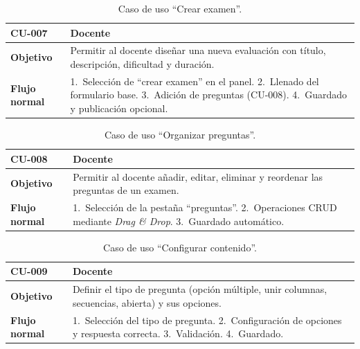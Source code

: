 \begin{table}[H]
\centering
\caption{Caso de uso ``Crear examen''.}
\label{tab:cu_crear_examen}
\begin{small}
\begin{tabularx}{\textwidth}{|L{3cm}|X|}
\hline
{}
 CU-007 &  Docente\\
\hline
\textbf{Objetivo} & Permitir al docente diseñar una nueva evaluación con título, descripción, dificultad y duración.\\
\hline
\textbf{Flujo normal} & 1.~Selección de ``crear examen'' en el panel. 2.~Llenado del formulario base. 3.~Adición de preguntas (CU-008). 4.~Guardado y publicación opcional.\\
\hline
\end{tabularx}
\end{small}
\fuenteautor
\end{table}

\begin{table}[H]
\centering
\caption{Caso de uso ``Organizar preguntas''.}
\label{tab:cu_org_preg}
\begin{small}
\begin{tabularx}{\textwidth}{|L{3cm}|X|}
\hline
{}
 CU-008 &  Docente\\
\hline
\textbf{Objetivo} & Permitir al docente añadir, editar, eliminar y reordenar las preguntas de un examen.\\
\hline
\textbf{Flujo normal} & 1.~Selección de la pestaña ``preguntas''. 2.~Operaciones CRUD mediante \textit{Drag \& Drop}. 3.~Guardado automático.\\
\hline
\end{tabularx}
\end{small}
\fuenteautor
\end{table}

\begin{table}[H]
\centering
\caption{Caso de uso ``Configurar contenido''.}
\label{tab:cu_config}
\begin{small}
\begin{tabularx}{\textwidth}{|L{3cm}|X|}
\hline
{}
 CU-009 &  Docente\\
\hline
\textbf{Objetivo} & Definir el tipo de pregunta (opción múltiple, unir columnas, secuencias, abierta) y sus opciones.\\
\hline
\textbf{Flujo normal} & 1.~Selección del tipo de pregunta. 2.~Configuración de opciones y respuesta correcta. 3.~Validación. 4.~Guardado.\\
\hline
\end{tabularx}
\end{small}
\fuenteautor
\end{table}

